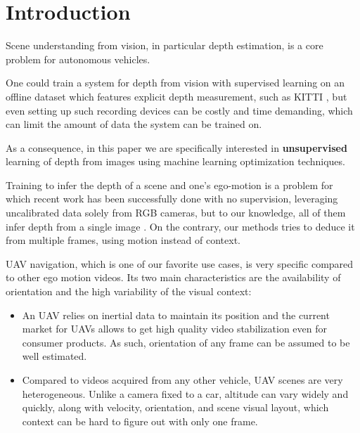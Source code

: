 \documentclass[runningheads]{llncs}
\begin{document}
\section{Introduction}
\label{sec:intro}
Scene understanding from vision, in particular depth estimation, is a core problem for autonomous vehicles.

One could train a system for depth from vision with supervised learning on an offline dataset which features explicit depth measurement, such as KITTI \cite{geiger2013vision}, but even setting up such recording devices can be costly and time demanding, which can limit the amount of data the system can be trained on.

As a consequence, in this paper we are specifically interested in \textbf{unsupervised} learning of depth from images using machine learning optimization techniques.

Training to infer the depth of a scene and one's ego-motion is a problem for which recent work has been successfully done with no supervision, leveraging uncalibrated data solely from RGB cameras, but to our knowledge, all of them infer depth from a single image
\cite{zhou2017unsupervised,yin2018geonet,monodepth17,Vijayanarasimhan17,Mahjourian}. On the contrary, our methods tries to deduce it from multiple frames, using motion instead of context.

UAV navigation, which is one of our favorite use cases, is very specific compared to other ego motion videos. Its two main characteristics are the availability of orientation and the high variability of the visual context:
 
\begin{itemize}
\item An UAV relies on inertial data to maintain its position and the current market for UAVs allows to get high quality video stabilization even for consumer products. As such, orientation of any frame can be assumed to be well estimated.
\item Compared to videos acquired from any other vehicle,
UAV scenes are very heterogeneous. Unlike a camera fixed to a car, altitude can vary widely and quickly, along with velocity, orientation, and scene 
visual layout,
which context can be hard to figure out with only one frame.
\end{itemize}
\end{document}
